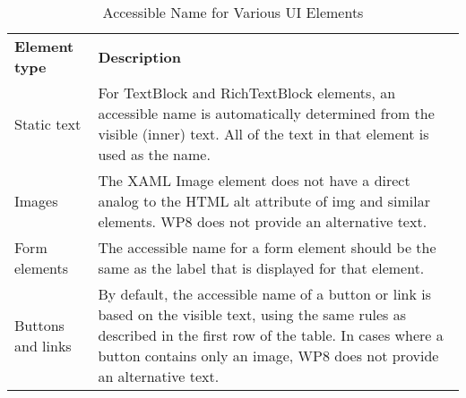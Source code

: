 \begin{table}[htbp]
  \centering
  \caption{Accessible Name for Various UI Elements}
    \label{tab:accessibleNameWP8}%
    \renewcommand{\arraystretch}{1.2}
    \begin{tabularx}{\textwidth}{l|X}
    \rowcolor{mygray}
    \textbf{Element type} & \textbf{Description} \\
    Static text & For TextBlock and RichTextBlock elements, an accessible name is automatically determined from the visible (inner) text. All of the text in that element is used as the name. \\ \hline
    Images & The XAML Image element does not have a direct analog to the HTML alt attribute of img and similar elements. WP8 does not provide an alternative text. \\ \hline
    Form elements & The accessible name for a form element should be the same as the label that is displayed for that element.\\ \hline
    Buttons and links & By default, the accessible name of a button or link is based on the visible text, using the same rules as described in the first row of the table. In cases where a button contains only an image, WP8 does not provide an alternative text. \\
    \end{tabularx}%
\end{table}%
